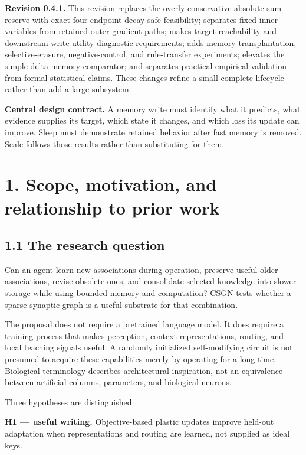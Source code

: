 \documentclass[
  11pt,
  a4paper,
]{article}
\begin{document}
\textbf{Revision 0.4.1.} This revision replaces the overly conservative
absolute-sum reserve with exact four-endpoint decay-safe feasibility;
separates fixed inner variables from retained outer gradient paths;
makes target reachability and downstream write utility diagnostic
requirements; adds memory transplantation, selective-erasure,
negative-control, and rule-transfer experiments; elevates the simple
delta-memory comparator; and separates practical empirical validation
from formal statistical claims. These changes refine a small complete
lifecycle rather than add a large subsystem.

\textbf{Central design contract.} A memory write must identify what it
predicts, what evidence supplies its target, which state it changes, and
which loss its update can improve. Sleep must demonstrate retained
behavior after fast memory is removed. Scale follows those results
rather than substituting for them.

\section{1. Scope, motivation, and relationship to prior
work}\label{scope-motivation-and-relationship-to-prior-work}

\subsection{1.1 The research question}\label{the-research-question}

Can an agent learn new associations during operation, preserve useful
older associations, revise obsolete ones, and consolidate selected
knowledge into slower storage while using bounded memory and
computation? CSGN tests whether a sparse synaptic graph is a useful
substrate for that combination.

The proposal does not require a pretrained language model. It does
require a training process that makes perception, context
representations, routing, and local teaching signals useful. A randomly
initialized self-modifying circuit is not presumed to acquire these
capabilities merely by operating for a long time. Biological terminology
describes architectural inspiration, not an equivalence between
artificial columns, parameters, and biological neurons.

Three hypotheses are distinguished:

\textbf{H1 --- useful writing.} Objective-based plastic updates improve
held-out adaptation when representations and routing are learned, not
supplied as ideal keys.
\end{document}
